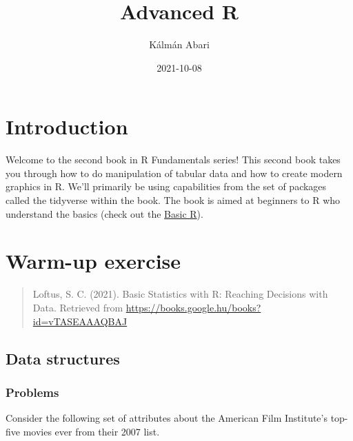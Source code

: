 \documentclass[
]{book}
\title{Advanced R}
\author{Kálmán Abari}
\date{2021-10-08}
\begin{document}
\maketitle

{
\setcounter{tocdepth}{1}
\tableofcontents
}
\hypertarget{introduction}{%
\chapter{Introduction}\label{introduction}}

Welcome to the second book in R Fundamentals series! This second book takes you through how to do manipulation of tabular data and how to create modern graphics in R. We'll primarily be using capabilities from the set of packages called the tidyverse within the book. The book is aimed at beginners to R who understand the basics (check out the \href{https://abarik.github.io/basicr_2020_21_2/}{Basic R}).

\hypertarget{warm-up-exercise}{%
\chapter{Warm-up exercise}\label{warm-up-exercise}}

\begin{quote}
Loftus, S. C. (2021). Basic Statistics with R: Reaching Decisions with Data. Retrieved from \url{https://books.google.hu/books?id=vTASEAAAQBAJ}
\end{quote}

\hypertarget{data-structures}{%
\section{Data structures}\label{data-structures}}

\hypertarget{problems}{%
\subsection{Problems}\label{problems}}

Consider the following set of attributes about the American Film Institute's top-five movies ever from their 2007 list.
\end{document}
